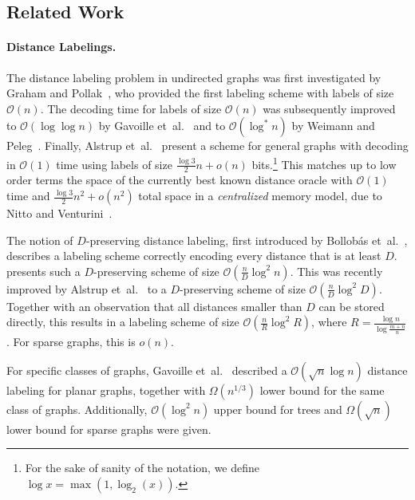 \documentclass{article}[11pt,letter]
\newcommand{\bigo}{\mathcal{O}}
\newcommand{\symb}{R}
\newcommand{\etal}{{et~al.}\xspace}
\begin{document}
\subsection{Related Work}

\paragraph{Distance Labelings.}
The distance labeling problem in undirected graphs was first investigated by Graham and Pollak~\cite{pollak}, who provided the first labeling scheme with labels of size $\bigo(n)$. The decoding time for labels of size $\bigo(n)$ was subsequently improved to $\bigo(\log \log n)$ by Gavoille \etal~\cite{Gavoille:2004:DLG:1036161.1036165} and to $\bigo (\log^* n)$ by Weimann and Peleg~\cite{WP11}. Finally, Alstrup \etal~\cite{DBLP:conf/soda/AlstrupGHP16} present a scheme for general graphs with decoding in $\bigo(1)$ time using labels of size $\frac{\log 3}{2} n + o(n)$ bits.\footnote{For the sake of sanity of the notation, we define $\log x = \max(1, \log_2(x))$.} This matches up to low order terms the space of the currently best known distance oracle with $\bigo(1)$ time and $\frac{\log 3}{2} n^2 + o(n^2)$ total space in a \emph{centralized} memory model, due to Nitto and Venturini~\cite{NV08}.

The notion of $D$-preserving distance labeling, first introduced by Bollob\'as \etal~\cite{BCE05}, describes a labeling scheme correctly encoding every distance that is at least $D$. \cite{BCE05} presents such a $D$-preserving scheme of size $\bigo(\frac{n}{D} \log^2 n)$.
This was recently improved by Alstrup \etal~\cite{Sublinear} to a $D$-preserving scheme of size $\bigo(\frac{n}{D}\log^2 D)$. Together with an observation that all distances smaller than $D$ can be stored directly, this results in a labeling scheme of size $\bigo(\frac{n}{\symb}\log^2 \symb)$, where $\symb = \frac{\log n}{\log \frac{m+n}{n}}$. For sparse graphs, this is $o(n)$.

For specific classes of graphs, Gavoille \etal~\cite{Gavoille:2004:DLG:1036161.1036165} described a $\bigo(\sqrt{n}\log n)$ distance labeling for planar graphs, together with $\Omega(n^{1/3})$ lower bound for the same class of graphs. Additionally, $\bigo(\log^2 n)$ upper bound for trees and $\Omega(\sqrt{n})$ lower bound for sparse graphs were given.
\end{document}
